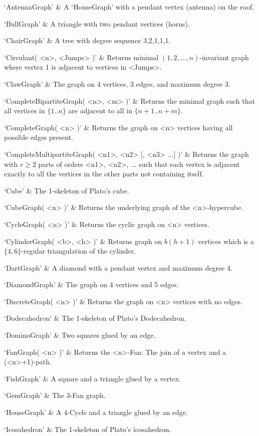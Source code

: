 `AntennaGraph' & 
A `HouseGraph' with a pendant vertex (antenna) on the roof.

`BullGraph' & 
A triangle with two pendant vertices (horns).

`ChairGraph' & 
A tree with degree sequence 3,2,1,1,1.

`Circulant( <n>, <Jumps> )' & 
Returns minimal $(1, 2, ..., n)$-invariant graph where vertex 1 is adjacent to vertices in <Jumps>.

`ClawGraph' & 
The graph on 4 vertices, 3 edges, and maximum degree 3.

`CompleteBipartiteGraph( <n>, <m> )' & 
Returns the minimal graph such that all vertices in $\{1..n\}$ are adjacent to all in $\{n+1..n+m\}$.

`CompleteGraph( <n> )' & 
Returns the graph on <n> vertices having all possible edges present.

`CompleteMultipartiteGraph( <n1>, <n2> [, <n3> ...] )' & 
Returns the graph with $r\geq 2$ parts of orders <n1>, <n2>, ... such that each vertex is adjacent exactly to all the vertices in the other parts not containing itself.

`Cube' & 
The 1-skeleton of Plato's cube.

`CubeGraph( <n> )' & 
Returns the underlying graph of the <n>-hypercube.

`CycleGraph( <n> )' & 
Returns the cyclic graph on <n> vertices. 

`CylinderGraph( <b>, <h> )' & 
Returns graph on $b(h+1)$ vertices which is a $\{4,6\}$-regular triangulation of the cylinder.

`DartGraph' & 
A diamond with a pendant vertex and maximum degree 4.

`DiamondGraph' & 
The graph on 4 vertices and 5 edges.

`DiscreteGraph( <n> )' & 
Returns the graph on <n> vertices with no edges.

`Dodecahedron' & 
The 1-skeleton of Plato's Dodecahedron.

`DominoGraph' & 
Two squares glued by an edge.

`FanGraph( <n> )' & 
Returns the <n>-Fan: The join of a vertex and a (<n>+1)-path.

`FishGraph' & 
A square and a triangle glued by a vertex.

`GemGraph' & 
The 3-Fan graph.

`HouseGraph' & 
A 4-Cycle and a triangle glued by an edge.

`Icosahedron' & 
The 1-skeleton of Plato's icosahedron.

